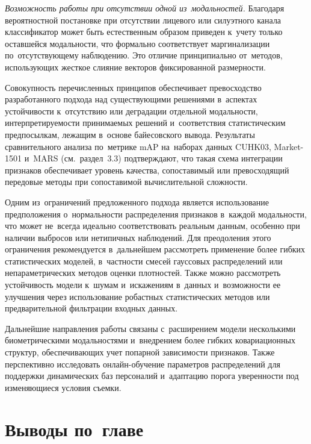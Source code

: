 \textit{Возможность работы при отсутствии одной из~модальностей.}
Благодаря вероятностной постановке при отсутствии лицевого или
силуэтного канала классификатор может быть естественным образом
приведен к~учету только оставшейся модальности, что формально
соответствует маргинализации по~отсутствующему наблюдению. Это
отличие принципиально от~методов, использующих жесткое слияние
векторов фиксированной размерности.

Совокупность перечисленных принципов обеспечивает превосходство
разработанного подхода над существующими решениями в~аспектах
устойчивости к~отсутствию или деградации отдельной модальности,
интерпретируемости принимаемых решений и~соответствия статистическим
предпосылкам, лежащим в~основе байесовского вывода. Результаты
сравнительного анализа по~метрике mAP на~наборах данных CUHK03,
Market-1501 и~MARS (см.~раздел~3.3) подтверждают, что такая схема
интеграции признаков обеспечивает уровень качества, сопоставимый или
превосходящий передовые методы при сопоставимой вычислительной
сложности.

Одним из~ограничений предложенного подхода является использование
предположения о~нормальности распределения признаков в~каждой
модальности, что может не~всегда идеально соответствовать реальным
данным, особенно при наличии выбросов или нетипичных наблюдений. Для
преодоления этого ограничения рекомендуется в~дальнейшем рассмотреть
применение более гибких статистических моделей, в~частности смесей
гауссовых распределений или непараметрических методов оценки
плотностей. Также можно рассмотреть устойчивость модели к~шумам
и~искажениям в~данных и~возможности ее улучшения через использование
робастных статистических методов или предварительной фильтрации
входных данных.

Дальнейшие направления работы связаны с~расширением модели
несколькими биометрическими модальностями и~внедрением более гибких
ковариационных структур, обеспечивающих учет попарной зависимости
признаков. Также перспективно исследовать онлайн-обучение параметров
распределений для поддержки динамических баз персоналий и~адаптацию
порога уверенности под изменяющиеся условия съемки.

\section{Выводы по~главе}\label{sec:ch2/conclusion}

